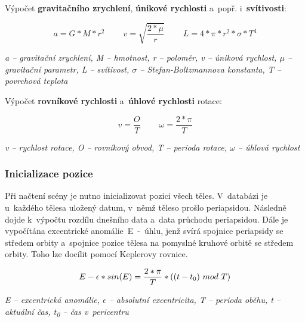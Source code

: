 \documentclass[a4paper,12pt]{article}
\begin{document}
Výpočet \textbf{gravitačního zrychlení}, \textbf{únikové rychlosti} a~popř. i~\textbf{svítivosti}:

\vspace*{-0.5cm}
$$a = G * M * r^2~~~~~~~~~~v = \sqrt{\frac{2 * \mu}{r}}~~~~~~~~~~L = 4 * \pi * r^2 * \sigma * T^4$$
\begin{center}
\textit{a -- gravitační zrychlení, M -- hmotnost, r -- poloměr, v -- úniková rychlost, $\mu$ -- gravitační parametr, L -- svítivost, $\sigma$ -- Stefan-Boltzmannova konstanta, T -- povrchová teplota}~\cite{kleczek}
\end{center}

Výpočet \textbf{rovníkové rychlosti} a~\textbf{úhlové rychlosti} rotace:

\vspace*{-0.5cm}
$$v = \frac{O}{T}~~~~~~~~~~\omega = \frac{2 * \pi}{T}$$
\begin{center}
\textit{v -- rychlost rotace, O -- rovníkový obvod, T -- perioda rotace, $\omega$ -- úhlová rychlost}~\cite{kleczek}
\end{center}


\subsubsection{Inicializace pozice}

Při načtení scény je nutno inicializovat pozici všech těles. V~databázi je u~každého tělesa uložený datum, v~němž těleso prošlo periapsidou. Následně dojde k~výpočtu rozdílu dnešního data a~data průchodu periapsidou. Dále je vypočítána excentrické anomálie~E~-~úhlu, jenž svírá spojnice periapsidy se středem orbity a~spojnice pozice tělesa na pomyslné kruhové orbitě se středem orbity. Toho lze docílit pomocí Keplerovy rovnice.~\cite{kleczek}

\vspace*{-0.5cm}
$$E -  \epsilon * sin(E) = \frac{2 * \pi}{T} * ((t - t\textsubscript{0})~mod~T)$$
\begin{center}
\textit{E -- excentrická anomálie, $\epsilon$ -- absolutní excentricita, T -- perioda oběhu, t -- aktuální čas, t\textsubscript{0} -- čas v~pericentru}~\cite{kleczek}
\end{center}
\end{document}
